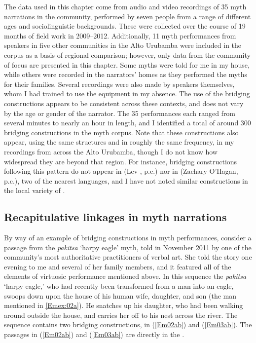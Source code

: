 \documentclass[output=paper]{LSP/langsci}
\begin{document}
The data used in this chapter come from audio and video recordings of 35 myth narrations in the community, performed by seven people from a range of different ages and sociolinguistic backgrounds. These were collected over the course of 19 months of field work in 2009--2012. Additionally, 11 myth performances from speakers in five other communities in the {Alto Urubamba} were included in the corpus as a basis of regional comparison; however, only data from the community of focus are presented in this chapter. Some myths were told for me in my house, while others were recorded in the narrators’ homes as they performed the myths for their families. Several recordings were also made by  speakers themselves, whom I had trained to use the equipment in my absence. The use of the bridging constructions appears to be consistent across these contexts, and does not vary by the age or gender of the narrator. The 35 performances each ranged from several minutes to nearly an hour in length, and I identified a total of around 300 bridging constructions in the myth corpus. Note that these constructions also appear, using the same structures and in roughly the same frequency, in my recordings from across the {Alto Urubamba}, though I do not know how widespread they are beyond that region. For instance, bridging constructions following this pattern do not appear in  (Lev \citeauthor{michael08}, p.c.) nor in  (Zachary O’Hagan, p.c.), two of the nearest  languages, and I have not noted similar constructions in the local variety of . 

\subsection{Recapitulative linkages in myth narrations}
\label{Emrecap.myth}
By way of an example of bridging constructions in  myth performances, consider a passage from the \textit{pakitsa} `harpy eagle' myth, told in November 2011 by one of the community’s most authoritative practitioners of  verbal art. She told the story one evening to me and several of her family members, and it featured all of the elements of virtuosic performance mentioned above. In this sequence the \textit{pakitsa} `harpy eagle,' who had recently been transformed from a man into an eagle, swoops down upon the house of his human wife, daughter, and son (the man mentioned in \ref{Emex:02a}). He snatches up his daughter, who had been walking around outside the house, and carries her off to his nest across the river. The sequence contains two bridging constructions, in (\ref{Em02ab}) and (\ref{Em03ab}). The passages in (\ref{Em02ab}) and (\ref{Em03ab}) are directly  in the . 
\end{document}
